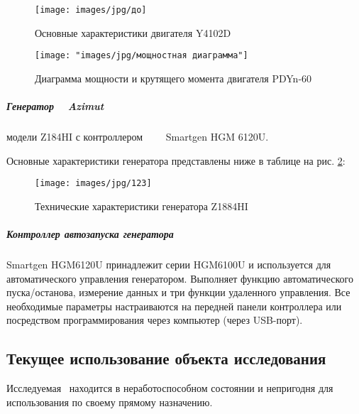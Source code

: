 \begin{figure}[H]
	\centering
	\texttt{[image: images/jpg/до]}
	\caption{Основные характеристики двигателя Y4102D}
	\label{fig:12}
\end{figure}

\begin{figure}[H]
	\centering
	\texttt{[image: "images/jpg/мощностная диаграмма"]}
	\caption[]{Диаграмма мощности и крутящего момента двигателя PDYn-60}
\end{figure}


\subparagraph{Генератор  
	Azimut} модели  Z184HI с контроллером   
	Smartgen HGM 6120U.
	
	Основные характеристики генератора представлены ниже в таблице на рис. \ref{fig:123}:\\
		
\begin{figure}[H]
	\centering
	\texttt{[image: images/jpg/123]}
	\caption{Технические характеристики генератора Z1884HI}
	\label{fig:123}
\end{figure}

	
	
%	
%
\subparagraph {Контроллер автозапуска генератора} Smartgen HGM6120U принадлежит серии HGM6100U и используется для автоматического управления генератором. Выполняет функцию автоматического пуска/останова, измерение данных и три функции удаленного управления. Все необходимые параметры настраиваются на передней панели контроллера или посредством программирования через компьютер (через USB-порт). 
	


\subsection{Текущее использование объекта исследования}

Исследуемая  \ находится в неработоспособном состоянии и непригодня для использования по своему прямому назначению.


